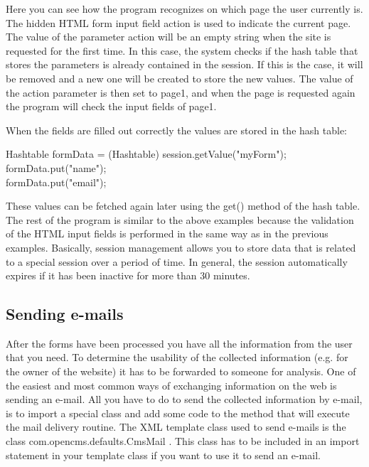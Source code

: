 Here you can see how the program recognizes on which page the user
currently is. The hidden HTML form input field {\name action} is used to
indicate the current page. The value of the parameter {\name action} will be an empty
string when the site is requested for the first time. In this case, the
system checks if the hash table that stores the parameters is already
contained in the session. If this is the case, it will be removed and a
new one will be created to store the new values. The value of the {\name action} parameter 
is then set to {\name page1}, and when the page is requested again
the program will check the input fields of page1.

When the fields are filled out correctly the values are stored in the
hash table:
\begin{java}
Hashtable formData = (Hashtable) session.getValue("myForm");\\
formData.put("name");\\
formData.put("email");\\
\end{java}


These values can be fetched again later using the {\meth  get()} method of the
hash table. The rest of the program is similar to the above examples
because the validation of the HTML input fields is performed in the same
way as in the previous examples.
Basically, session management allows you to store data that is related
to a special session over a period of time. In general, the session
automatically expires if it has been inactive for more than 30 minutes.


\subsection{Sending e-mails}

After the forms have been processed you have all the information from
the user that you need. To determine the usability of the collected
information (e.g. for the owner of the website) it has to be forwarded to
someone for analysis. One of the easiest and most common ways of exchanging
information on the web is sending an e-mail. All you have to do to
send the collected information by e-mail, is to import a special class
and add some code to the method that will execute the mail delivery
routine. 
The XML template class used to send e-mails is the class {\class com.opencms.defaults.CmsMail} .
This class has to be included in an import statement in your template class
if you want to use it to send an e-mail.

